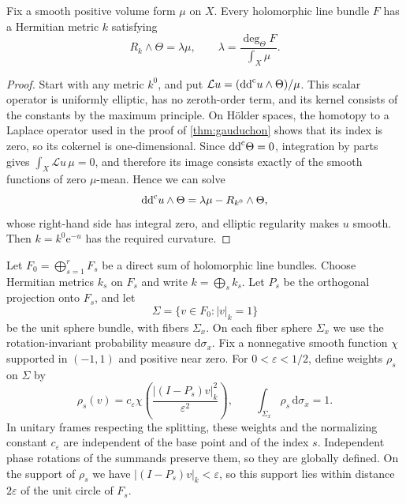 \begin{lemma}\label{lem:bundle-degree-normalization}
Fix a smooth positive volume form $\mu$ on $X$. Every holomorphic line bundle $F$ has a Hermitian metric $k$ satisfying
\[
 R_k\wedge\Theta=\lambda\mu,
 \qquad \lambda=\frac{\deg_\Theta F}{\int_X\mu}.
\]
\end{lemma}
\begin{proof}
Start with any metric $k^0$, and put $\mathcal Lu=(\mathrm{dd}^{\mathrm{c}} u\wedge\Theta)/\mu$. This scalar operator is uniformly elliptic, has no zeroth-order term, and its kernel consists of the constants by the maximum principle. On H\"older spaces, the homotopy to a Laplace operator used in the proof of \cref{thm:gauduchon} shows that its index is zero, so its cokernel is one-dimensional. Since $\mathrm{dd}^{\mathrm{c}}\Theta=0$, integration by parts gives $\int_X\mathcal Lu\,\mu=0$, and therefore its image consists exactly of the smooth functions of zero $\mu$-mean. Hence we can solve
\[
 \mathrm{dd}^{\mathrm{c}} u\wedge\Theta=\lambda\mu-R_{k^0}\wedge\Theta,
\]
whose right-hand side has integral zero, and elliptic regularity makes $u$ smooth. Then $k=k^0\mathrm e^{-u}$ has the required curvature.
\end{proof}

Let $F_0=\bigoplus_{s=1}^rF_s$ be a direct sum of holomorphic line bundles. Choose Hermitian metrics $k_s$ on $F_s$ and write $k=\bigoplus_sk_s$. Let $P_s$ be the orthogonal projection onto $F_s$, and let
\[
 \Sigma=\{v\in F_0:|v|_k=1\}
\]
be the unit sphere bundle, with fibers $\Sigma_x$. On each fiber sphere $\Sigma_x$ we use the rotation-invariant probability measure $\mathrm d\sigma_x$. Fix a nonnegative smooth function $\chi$ supported in $(-1,1)$ and positive near zero. For $0<\varepsilon<1/2$, define weights $\rho_s$ on $\Sigma$ by
\[
 \rho_s(v)=c_\varepsilon\chi\left(\frac{|(I-P_s)v|_k^2}{\varepsilon^2}\right),
 \qquad \int_{\Sigma_x}\rho_s\,\mathrm d\sigma_x=1.
\]
In unitary frames respecting the splitting, these weights and the normalizing constant $c_\varepsilon$ are independent of the base point and of the index $s$. Independent phase rotations of the summands preserve them, so they are globally defined. On the support of $\rho_s$ we have $|(I-P_s)v|_k<\varepsilon$, so this support lies within distance $2\varepsilon$ of the unit circle of $F_s$.

